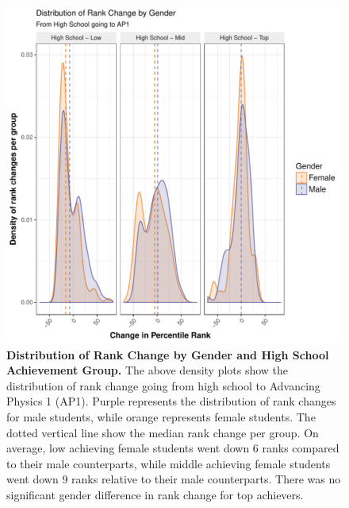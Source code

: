 \begin{figure}[!ht]
\centering
\includegraphics[width = \linewidth]{C3 - Bourdieu Networks/C3 - Fig6.pdf}
\caption{\textbf{Distribution of Rank Change by Gender and High School Achievement Group.\newline} 
The above density plots show the distribution of rank change going from high school to Advancing Physics 1 (AP1). Purple represents the distribution of rank changes for male students, while orange represents female students. The dotted vertical line show the median rank change per group. On average, low achieving female students went down 6 ranks compared to their male counterparts, while middle achieving female students went down 9 ranks relative to their male counterparts. There was no significant gender difference in rank change for top achievers.}
\label{Fig6}
\end{figure}

